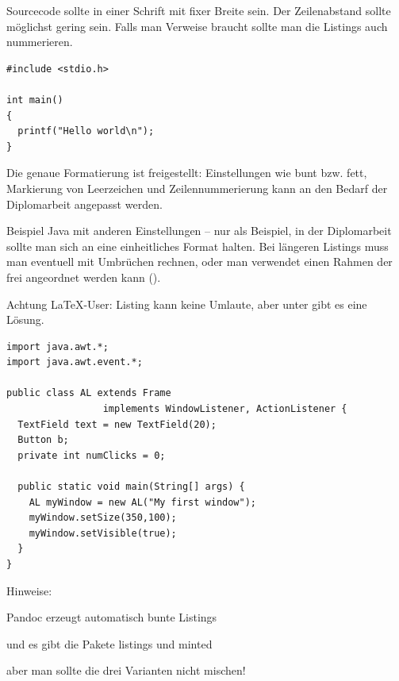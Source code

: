 Sourcecode sollte in einer Schrift mit fixer Breite sein. Der Zeilenabstand sollte möglichst gering sein.
Falls man Verweise braucht sollte man die Listings auch nummerieren.

\lstset{numbers=left, numberstyle=\tiny, stepnumber=2, numbersep=5pt, showspaces=true, frame=single}
\lstset{language=C}

\begin{lstlisting}
#include <stdio.h>

int main()
{
  printf("Hello world\n");
}
\end{lstlisting}

Die genaue Formatierung ist freigestellt: Einstellungen wie bunt bzw.
fett, Markierung von Leerzeichen und Zeilennummerierung kann an den
Bedarf der Diplomarbeit angepasst werden.

Beispiel Java mit anderen Einstellungen -- nur als Beispiel, in der
Diplomarbeit sollte man sich an eine einheitliches Format halten.
Bei längeren Listings muss man eventuell mit Umbrüchen rechnen, oder
man verwendet einen Rahmen der frei angeordnet werden kann ().

\lstset{numbers=right, numberstyle=\tiny, stepnumber=2, numbersep=5pt, showspaces=false, frame=single}
\lstset{language=Java}

Achtung \LaTeX{}-User: Listing kann keine Umlaute, aber unter \citep{listingtipp}
gibt es eine Lösung.

\begin{lstlisting}[caption={Java Beispiel},captionpos=b]
import java.awt.*;
import java.awt.event.*;

public class AL extends Frame
                 implements WindowListener, ActionListener {
  TextField text = new TextField(20);
  Button b;
  private int numClicks = 0;

  public static void main(String[] args) {
    AL myWindow = new AL("My first window");
    myWindow.setSize(350,100);
    myWindow.setVisible(true);
  }
}
\end{lstlisting}

\needspace{2cm}
Hinweise:
\begin{liste}
\item Pandoc erzeugt automatisch bunte Listings
\item und es gibt die Pakete listings und minted
\item aber man sollte die drei Varianten nicht mischen!
\end{liste}


